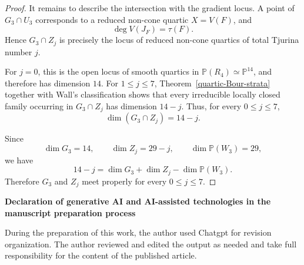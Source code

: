 \documentclass[11pt]{amsart} %
\theoremstyle{definition}
\def\NZQ{\mathbb}               %
\def\PP{{\NZQ P}}
\begin{document}
\begin{proof}
It remains to describe the intersection with the gradient locus.
A point of $G_3\cap U_3$ corresponds to a reduced non-cone quartic
$X=V(F)$, and
\[
\deg V(J_F)=\tau(F).
\]
Hence $G_3\cap Z_j$ is precisely the locus of reduced non-cone
quartics of total Tjurina number $j$.

For $j=0$, this is the open locus of smooth quartics in \(\PP(R_4)\simeq\PP^{14}\),
and therefore has dimension $14$. For $1\leq j\leq7$,
Theorem~\ref{quartic-Bour-strata} together with Wall's classification
shows that every irreducible locally closed family occurring in
$G_3\cap Z_j$ has dimension
\(14-j\). Thus, for every $0\leq j\leq7$,
\[
\dim(G_3\cap Z_j)=14-j.
\]

Since
\[
\dim G_3=14,
\qquad
\dim Z_j=29-j,
\qquad
\dim\PP(W_3)=29,
\]
we have
\[
14-j
=
\dim G_3+\dim Z_j-\dim\PP(W_3).
\]
Therefore $G_3$ and $Z_j$ meet properly for every $0\leq j\leq7$.
\end{proof}

\textbf{Declaration of generative AI and AI-assisted technologies in the manuscript preparation process}

During the preparation of this work, the author used Chatgpt for revision organization. The author reviewed and edited the output as needed and take full responsibility for the content of the published article. 

\end{document}

